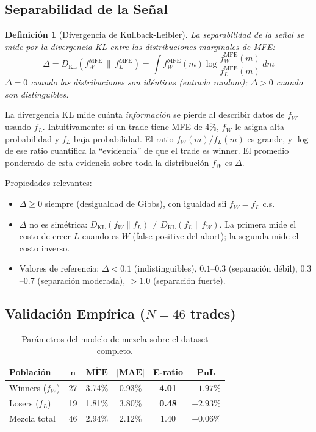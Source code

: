 \documentclass[11pt,a4paper]{article}
\newtheorem{definition}{Definici\'on}[section]
\newcommand{\KL}{D_{\mathrm{KL}}}
\begin{document}
\subsection{Separabilidad de la Se\~nal}

\begin{definition}[Divergencia de Kullback-Leibler]
\label{def:kl}
La separabilidad de la se\~nal se mide por la divergencia KL
\cite{cover2006elements} entre las distribuciones marginales de MFE:
\begin{equation}
\Delta = \KL\!\left(f_W^{\text{MFE}} \,\|\, f_L^{\text{MFE}}\right)
= \int f_W^{\text{MFE}}(m) \log \frac{f_W^{\text{MFE}}(m)}{f_L^{\text{MFE}}(m)} \, dm
\label{eq:kl}
\end{equation}
$\Delta = 0$ cuando las distribuciones son id\'enticas (entrada random);
$\Delta > 0$ cuando son distinguibles.
\end{definition}

La divergencia KL mide cu\'anta \textit{informaci\'on} se pierde al
describir datos de $f_W$ usando $f_L$. Intuitivamente: si un trade
tiene MFE de 4\%, $f_W$ le asigna alta probabilidad y $f_L$ baja
probabilidad. El ratio $f_W(m)/f_L(m)$ es grande, y $\log$ de ese
ratio cuantifica la ``evidencia'' de que el trade es winner. El promedio
ponderado de esta evidencia sobre toda la distribuci\'on $f_W$ es $\Delta$.

Propiedades relevantes:
\begin{itemize}[leftmargin=1.5em]
\item $\Delta \geq 0$ siempre (desigualdad de Gibbs), con igualdad
  sii $f_W = f_L$ c.s.
\item $\Delta$ no es sim\'etrica:
  $\KL(f_W \| f_L) \neq \KL(f_L \| f_W)$.
  La primera mide el costo de creer $L$ cuando es $W$
  (false positive del abort); la segunda mide el costo inverso.
\item Valores de referencia: $\Delta < 0.1$ (indistinguibles),
  $0.1$--$0.3$ (separaci\'on d\'ebil), $0.3$--$0.7$ (separaci\'on
  moderada), $> 1.0$ (separaci\'on fuerte).
\end{itemize}


\subsection{Validaci\'on Emp\'irica ($N=46$ trades)}

\begin{table}[H]
\centering
\caption{Par\'ametros del modelo de mezcla sobre el dataset completo.}
\label{tab:mixture_full}
\begin{tabular}{lccccc}
\toprule
\textbf{Poblaci\'on} & $\bm{n}$ & $\overline{\textbf{MFE}}$ &
  $\overline{|\textbf{MAE}|}$ & \textbf{E-ratio} & $\overline{\textbf{PnL}}$ \\
\midrule
Winners ($f_W$) & 27 & 3.74\% & 0.93\% & \textbf{4.01} & $+1.97\%$ \\
Losers ($f_L$) & 19 & 1.81\% & 3.80\% & \textbf{0.48} & $-2.93\%$ \\
\midrule
Mezcla total & 46 & 2.94\% & 2.12\% & 1.40 & $-0.06\%$ \\
\bottomrule
\end{tabular}
\end{table}
\end{document}
